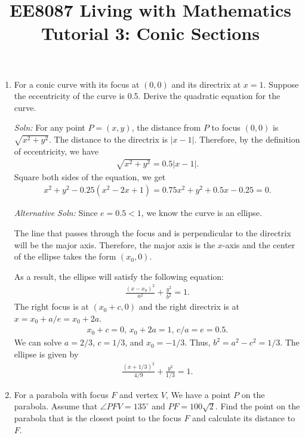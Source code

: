 \documentclass{article}
\title{EE8087 Living with Mathematics\\Tutorial 3: Conic Sections}
\date{}
\begin{document}
 \maketitle
\begin{enumerate}
\item For a conic curve with its focus at $(0,0)$ and its directrix at $x = 1$. Suppose the eccentricity of the curve is 0.5. Derive the quadratic equation for the curve.

  \emph{Soln:} For any point $P = (x,y)$, the distance from $P$ to focus $(0,0)$ is $\sqrt{x^2+y^2}$. The distance to the directrix is $|x-1|$. Therefore, by the definition of eccentricity, we have
  \begin{align*}
    \sqrt{x^2+ y^2} = 0.5|x-1|.
  \end{align*}
  Square both sides of the equation, we get
  \begin{align*}
    x^2+ y^2 - 0.25(x^2 - 2x + 1) = 0.75x^2 + y^2 +0.5x -0.25 = 0.
  \end{align*}

\emph{Alternative Soln:} Since $e = 0.5 < 1$, we know the curve is an ellipse.

The line that passes through the focus and is perpendicular to the directrix will be the major axis. Therefore, the major axis is the $x$-axis and the center of the ellipse takes the form $(x_0,0)$.

As a result, the ellipse will satisfy the following equation:
\begin{align*}
  \frac{(x-x_0)^2}{a^2} + \frac{y^2}{b^2} = 1.
\end{align*}
The right focus is at $(x_0+c,0)$ and the right directrix is at $x = x_0 + a/e = x_0 + 2a$.
\begin{align*}
  x_0 + c = 0,\,x_0+2a = 1,\,c/a = e= 0.5.
\end{align*}
We can solve $a = 2/3$, $c = 1/3$, and $x_0 = -1/3$. Thus, $b^2 = a^2-c^2 = 1/3$. The ellipse is given by
\begin{align*}
  \frac{(x+1/3)^2}{4/9} + \frac{y^2}{1/3} = 1.
\end{align*}
\newpage
\item For a parabola with focus $F$ and vertex $V$, We have a point $P$ on the parabola. Assume that $\angle PFV = 135^\circ$ and $PF = 100\sqrt{2}$. Find the point on the parabola that is the closest point to the focus $F$ and calculate its distance to $F$.
  
\begin{figure}[h]
  \centering
{}
\end{figure}
\end{enumerate}
\end{document}
